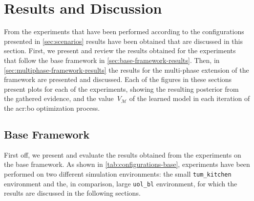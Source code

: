 \section{Results and Discussion}
\label{sec:results}

From the experiments that have been performed according to the configurations presented in \autoref{sec:scenarios} results have been obtained that are discussed in this section.
First, we present and review the results obtained for the experiments that follow the base framework in \autoref{sec:base-framework-results}.
Then, in \autoref{sec:multiphase-framework-results} the results for the multi-phase extension of the framework are presented and discussed. 
Each of the figures in these sections present plots for each of the experiments, showing the resulting posterior from the gathered evidence, and the value~$V_\mathcal{M}$ of the learned model in each iteration of the \acrshort{acr:bo} optimization process.

\subsection{Base Framework}
\label{sec:base-framework-results}

First off, we present and evaluate the results obtained from the experiments on the base framework.
As shown in \autoref{tab:configurations-base}, experiments have been performed on two different simulation environments: the small \texttt{tum\_kitchen} environment and the, in comparison, large \texttt{uol\_bl} environment, for which the results are discussed in the following sections.


